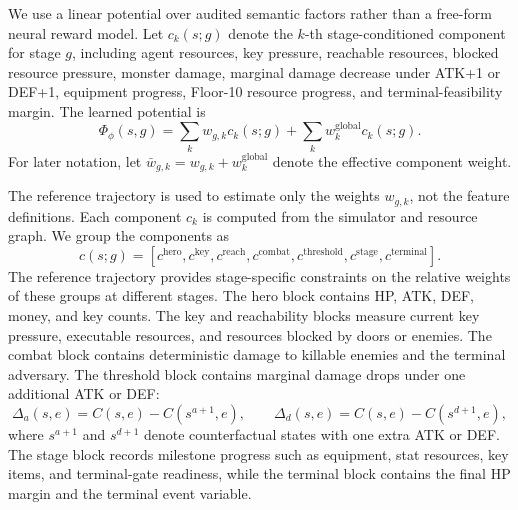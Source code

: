 \documentclass{article}
\begin{document}
We use a linear potential over audited semantic factors rather than a free-form
neural reward model.  Let
\(c_k(s;g)\) denote the \(k\)-th stage-conditioned component for stage \(g\),
including agent resources, key pressure, reachable resources, blocked resource
pressure, monster damage, marginal damage decrease under ATK+1 or DEF+1,
equipment progress, Floor-10 resource progress, and terminal-feasibility
margin.  The learned
potential is
\[
  \Phi_\phi(s,g)=
  \sum_k w_{g,k}c_k(s;g)+\sum_k w^{\mathrm{global}}_k c_k(s;g).
\]
For later notation, let
\(\bar w_{g,k}=w_{g,k}+w^{\mathrm{global}}_k\) denote the effective component
weight.

The reference trajectory is used to estimate only the weights \(w_{g,k}\), not the
feature definitions.  Each component \(c_k\) is computed from the simulator and
resource graph.  We group the components as
\[
  c(s;g)=
  \left[
  c^{\mathrm{hero}},
  c^{\mathrm{key}},
  c^{\mathrm{reach}},
  c^{\mathrm{combat}},
  c^{\mathrm{threshold}},
  c^{\mathrm{stage}},
  c^{\mathrm{terminal}}
  \right].
\]
The reference trajectory provides stage-specific constraints on the relative
weights of these groups at different
stages.  The hero block contains HP, ATK, DEF, money, and key counts.  The key
and reachability blocks measure current key pressure, executable resources, and
resources blocked by doors or enemies.  The combat block contains deterministic
damage to killable enemies and the terminal adversary.  The threshold block
contains marginal damage drops under one additional ATK or DEF:
\[
  \Delta_a(s,e)=C(s,e)-C(s^{a+1},e),\qquad
  \Delta_d(s,e)=C(s,e)-C(s^{d+1},e),
\]
where \(s^{a+1}\) and \(s^{d+1}\) denote counterfactual states with one extra
ATK or DEF.  The stage block records milestone progress such as equipment,
stat resources, key items, and terminal-gate readiness, while the terminal block
contains the final HP margin and the terminal event variable.
\end{document}
